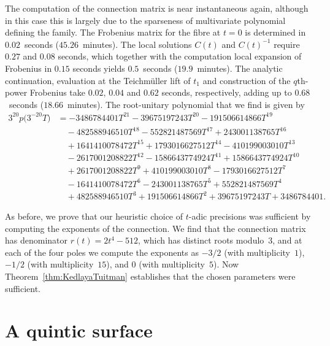 The computation of the connection matrix is near instantaneous 
again, although in this case this is largely due to the sparseness 
of multivariate polynomial defining the family.  The Frobenius 
matrix for the fibre at $t = 0$ is determined in $0.02$~seconds 
($45.26$~minutes).  The local solutions $C(t)$ and $C(t)^{-1}$ 
require $0.27$ and $0.08$ seconds, which together with the 
computation local expansion of Frobenius in $0.15$ seconds 
yields $0.5$~seconds ($19.9$~minutes).  The analytic continuation, 
evaluation at the Teichm\"uller lift of $t_1$  and construction 
of the $q$th-power Frobenius take $0.02$, $0.04$ and $0.62$ seconds, 
respectively, adding up to $0.68$~seconds ($18.66$~minutes).  The 
root-unitary polynomial that we find is given by 
\begin{align*}
3^{20} p\bigl(3^{-20} T\bigr) & = 
  -3486784401 T^{21} - 39675197243 T^{20} - 191506614866 T^{19} \\
& \quad - 482588946510 T^{18} - 552821487569 T^{17} + 243001138765 T^{16} \\
& \quad + 1641410078472 T^{15} + 1793016627512 T^{14} - 410199003010 T^{13} \\
& \quad - 2617001208822 T^{12} - 1586643774924 T^{11} + 1586643774924 T^{10} \\
& \quad + 2617001208822 T^9 + 410199003010 T^8 - 1793016627512 T^7 \\
& \quad - 1641410078472 T^6 - 243001138765 T^5 + 552821487569 T^4 \\
& \quad + 482588946510 T^3 + 191506614866 T^2 + 39675197243 T + 3486784401.
\end{align*}

As before, we prove that our heuristic choice of $t$-adic precisions 
was sufficient by computing the exponents of the connection. 
We find that the connection matrix has denominator $r(t) = 2 t^4 - 512$, 
which has distinct roots modulo~$3$, and at each of the four poles we 
compute the exponents as $-3/2$ (with multiplicity~$1$), $-1/2$ (with 
multiplicity~$15$), and $0$ (with multiplicity~$5$).
Now Theorem~\ref{thm:KedlayaTuitman} establishes that the chosen 
parameters were sufficient.

\section{A quintic surface}

